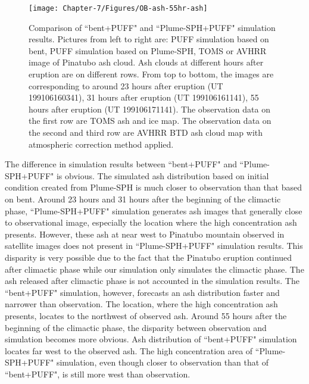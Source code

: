 \begin{figure}[!htb]
\begin{minipage}{.325 \textwidth}
    \end{minipage}%
    \begin{minipage}{.325 \textwidth}
        \centering
        \texttt{[image: Chapter-7/Figures/OB-ash-55hr-ash]}
    \end{minipage}%
    \caption{Comparison of ``bent+PUFF" and ``Plume-SPH+PUFF" simulation results. Pictures from left to right are: PUFF simulation based on bent, PUFF simulation based on Plume-SPH, TOMS or AVHRR image of Pinatubo ash cloud. Ash clouds at different hours after eruption are on different rows. From top to bottom, the images are corresponding to around 23 hours after eruption (UT 199106160341), 31 hours after eruption (UT 199106161141), 55 hours after eruption (UT 199106171141). The observation data on the first row are TOMS ash and ice map. The observation data on the second and third row are AVHRR BTD ash cloud map with atmospheric correction method applied.}
    \label{fig:Plume-SPH-PUFF-ash-cloud}
\end{figure}

The difference in simulation results between ``bent+PUFF" and ``Plume-SPH+PUFF" is obvious. The simulated ash distribution based on initial condition created from Plume-SPH is much closer to observation than that based on bent. Around 23 hours and 31 hours after the beginning of the climactic phase, ``Plume-SPH+PUFF" simulation generates ash images that generally close to observational image, especially the location where the high concentration ash presents. However, these ash at near west to Pinatubo mountain observed in satellite images does not present in ``Plume-SPH+PUFF" simulation results. This disparity is very possible due to the fact that the Pinatubo eruption continued after climactic phase while our simulation only simulates the climactic phase. The ash released after climactic phase is not accounted in the simulation results. The ``bent+PUFF" simulation, however, forecasts an ash distribution faster and narrower than observation. The location, where the high concentration ash presents, locates to the northwest of observed ash. 
Around 55 hours after the beginning of the climactic phase, the disparity between observation and simulation becomes more obvious. Ash distribution of ``bent+PUFF" simulation locates far west to the observed ash. The high concentration area of ``Plume-SPH+PUFF" simulation, even though closer to observation than that of ``bent+PUFF", is still more west than observation.

